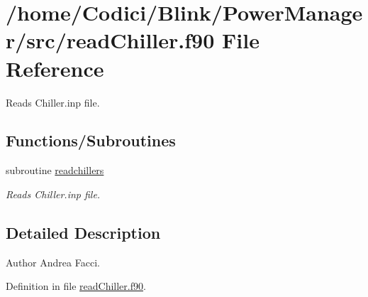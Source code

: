 \hypertarget{read_chiller_8f90}{\section{/home/\-Codici/\-Blink/\-Power\-Manager/src/read\-Chiller.f90 File Reference}
\label{read_chiller_8f90}
}


Reads Chiller.\-inp file.  


\subsection*{Functions/\-Subroutines}
\begin{DoxyCompactItemize}
\item 
subroutine \hyperlink{read_chiller_8f90_a3c06bf38f25f8177df77cbf0c1cfd834}{readchillers}
\begin{DoxyCompactList}\small\item\em Reads Chiller.\-inp file. \end{DoxyCompactList}\end{DoxyCompactItemize}


\subsection{Detailed Description}
\begin{DoxyAuthor}{Author}
Andrea Facci. 
\end{DoxyAuthor}


Definition in file \hyperlink{read_chiller_8f90_source}{read\-Chiller.\-f90}.



